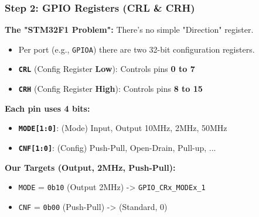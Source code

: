\documentclass{beamer}
\begin{document}
\begin{frame}
	\frametitle{Step 2: GPIO Registers (CRL \& CRH)}
	\textbf{The "STM32F1 Problem":} There's no simple "Direction" register.
	\medskip
	\begin{itemize}
		\item Per port (e.g., \texttt{GPIOA}) there are two 32-bit configuration registers.
		\item \textbf{\texttt{CRL}} (Config Register \textbf{Low}): Controls pins \textbf{0 to 7}
		\item \textbf{\texttt{CRH}} (Config Register \textbf{High}): Controls pins \textbf{8 to 15}
	\end{itemize}
	
	\bigskip
	\textbf{Each pin uses 4 bits:}
	\begin{itemize}
		\item \textbf{\texttt{MODE[1:0]}}: (Mode) Input, Output 10MHz, 2MHz, 50MHz
		\item \textbf{\texttt{CNF[1:0]}}: (Config) Push-Pull, Open-Drain, Pull-up, ...
	\end{itemize}
	
	\bigskip
	\textbf{Our Targets (Output, 2MHz, Push-Pull):}
	\begin{itemize}
		\item \texttt{MODE} = \texttt{0b10} (Output 2MHz) -> \texttt{GPIO\_CRx\_MODEx\_1}
		\item \texttt{CNF} = \texttt{0b00} (Push-Pull) -> (Standard, 0)
	\end{itemize}
\end{frame}
\end{document}

